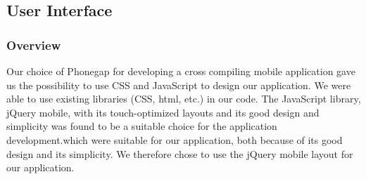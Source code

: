 \subsection{User Interface}
	\subsubsection{Overview}
	Our choice of Phonegap for developing a cross compiling mobile application gave us the possibility to use CSS and JavaScript to design our application. We were able to use existing libraries (CSS, html, etc.) in our code. The JavaScript library, jQuery mobile, with its touch-optimized layouts and its good design and simplicity was found to be a suitable choice for the application development.which were suitable for our application, both because of its good design and its simplicity. We therefore chose to use the jQuery mobile layout for our application.

